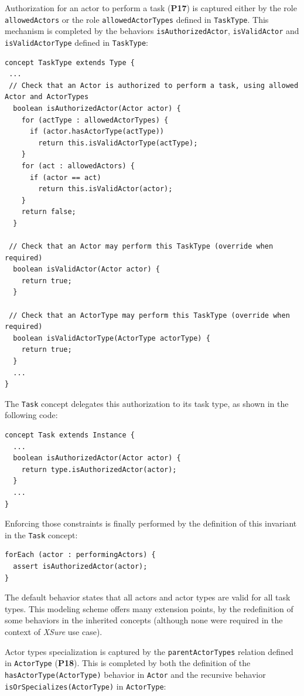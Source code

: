 Authorization for an actor to perform a task (\textbf{P17}) is captured either by the role \texttt{allowedActors} or the role \texttt{allowedActorTypes} defined in \texttt{TaskType}. This mechanism is completed by the behaviors \texttt{isAuthorizedActor}, \texttt{isValidActor} and \texttt{isValidActorType} defined in \texttt{TaskType}: 

\begin{lstlisting}
concept TaskType extends Type {
 ...
 // Check that an Actor is authorized to perform a task, using allowed Actor and ActorTypes
  boolean isAuthorizedActor(Actor actor) {      
    for (actType : allowedActorTypes) {        
      if (actor.hasActorType(actType))         
        return this.isValidActorType(actType);          
    }        
    for (act : allowedActors) {        
      if (actor == act)         
        return this.isValidActor(actor);
    }
    return false;
  }
  
 // Check that an Actor may perform this TaskType (override when required)
  boolean isValidActor(Actor actor) {
    return true;
  }

 // Check that an ActorType may perform this TaskType (override when required)
  boolean isValidActorType(ActorType actorType) {
    return true;
  }
  ...
}
\end{lstlisting}

The \texttt{Task} concept delegates this authorization to its task type, as shown in the following \FML code:

\begin{lstlisting}
concept Task extends Instance {
  ...
  boolean isAuthorizedActor(Actor actor) {      
    return type.isAuthorizedActor(actor);      
  }
  ...
}
\end{lstlisting}

Enforcing those constraints is finally performed by the definition of this invariant in the \texttt{Task} concept:

\begin{lstlisting}
forEach (actor : performingActors) {
  assert isAuthorizedActor(actor);
}
\end{lstlisting}

The default behavior states that all actors and actor types are valid for all task types. This modeling scheme offers many extension points, by the redefinition of some behaviors in the inherited concepts (although none were required in the context of \emph{XSure} use case).

Actor types specialization is captured by the \texttt{parentActorTypes} relation defined in \texttt{ActorType} (\textbf{P18}). This is completed by both the definition of the \texttt{hasActorType(ActorType)} behavior in \texttt{Actor} and the recursive behavior \texttt{isOrSpecializes(ActorType)} in \texttt{ActorType}:

